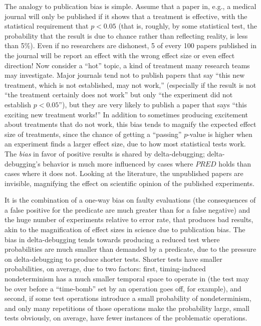 The analogy to publication bias is simple.  Assume that a paper in,
e.g., a medical journal will only be published if it shows that a
treatment is effective, with the statistical requirement that $p <
0.05$ (that is, roughly, by some statistical test, the probability
that the result is due to chance rather than reflecting reality, is
less than 5\%).  Even if no researchers are dishonest, 5 of every 100 papers published
in the journal will be report an effect with the wrong effect size or
even effect direction!  Now consider a ``hot'' topic, a kind of
treatment many research teams may investigate.  Major journals tend
not to publish papers that say ``this new treatment, which is not
established, may not work,'' (especially if the result is not ``the
treatment certainly does not work'' but only ``the experiment did not
establish $p < 0.05$''), but they  are very likely to publish a paper
that says ``this exciting new treatment works!''  In addition to
sometimes producing excitement about treatments that do not work, this
bias tends to magnify the expected effect size of treatments, since
the chance of getting a ``passing'' $p$-value is higher when an
experiment finds a larger effect size, due to how most statistical
tests work.
The \emph{bias} in
favor of positive results is shared by delta-debugging;
delta-debugging's behavior is much more influenced by cases where
$\mathit{PRED}$ holds than cases where it does not.  Looking at the
literature, the unpublished papers are invisible, magnifying the
effect on scientific opinion of the published experiments.

It is the combination of
a one-way bias on faulty evaluations (the consequences of a false
positive for the predicate are much greater than for a false negative)
and the huge number of experiments relative to error rate, that
produces bad results, akin to the magnification of effect sizes
in science due to publication bias.  The bias in delta-debugging tends
towards producing a reduced test where probabilities are much smaller
than demanded by a predicate, due to the pressure on delta-debugging
to produce shorter tests.  Shorter tests have smaller probabilities,
on average, due to two factors:  first, timing-induced nondeterminism
has a much smaller temporal space to operate in (the test may be over
before a ``time-bomb'' set by an operation goes off, for example), and second, if some
test operations introduce a small probability of nondeterminism, and
only many repetitions of those operations make the probability large,
small tests obviously, on average, have fewer instances of the
problematic operations.

